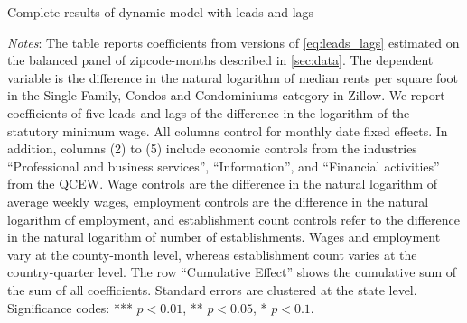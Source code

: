 \clearpage
\begin{table}[h!]
	\caption{Complete results of dynamic model with leads and lags}
	\label{tab:dynamic_lags_leads_main}
	\centering
	
	\begin{minipage}{0.95\textwidth} \footnotesize
		\vspace{3mm} 
		\textit{Notes}: The table reports coefficients from versions of 
		\autoref{eq:leads_lags} estimated on the balanced panel of zipcode-months
		described in \autoref{sec:data}. The dependent variable is the difference in 
		the natural logarithm of median	rents per square foot in the Single Family, Condos 
		and Condominiums category in Zillow. We report coefficients of five leads and lags 
		of the difference in the logarithm of the statutory minimum wage. All columns 
		control for monthly date fixed effects. In addition, columns (2) to (5) include 
		economic controls from the industries ``Professional and business services'', 
		``Information'', and ``Financial activities'' from the QCEW. Wage controls are 
		the difference in the natural logarithm of average weekly wages, employment 
		controls are the difference in the natural logarithm of employment, and 
		establishment count controls refer to the difference in the natural logarithm 
		of number of establishments. Wages and employment vary at the county-month level,
		whereas establishment count varies at the country-quarter level. The row 
		``Cumulative Effect'' shows the cumulative 	sum of the sum of all coefficients. 
		Standard errors are clustered at the state level. Significance codes: *** $p < 
		0.01$, ** $p < 0.05$, * $p < 0.1$.
	\end{minipage}
\end{table}

